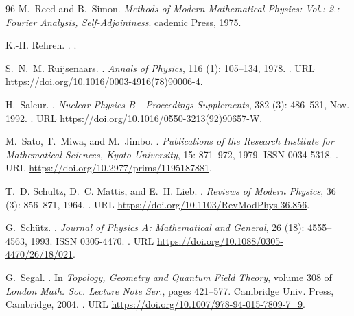 \documentclass[a4paper, 11pt]{article}
\DeclareMathOperator{\1}{\mathds{1}}
\begin{document}
\begin{thebibliography}{96}
M.~{R}eed and B.~{S}imon.
\newblock \emph{{Methods of Modern Mathematical Physics: Vol.: 2.: Fourier
  Analysis, Self-Adjointness}}.
cademic {P}ress, 1975.

K.-H. Rehren.
.
.

S.~N.~M. Ruijsenaars.
.
\newblock \emph{Annals of Physics}, 116 (1): 105--134, 1978.
\newblock {}.
\newblock URL \url{https://doi.org/10.1016/0003-4916(78)90006-4}.

H.~Saleur.
.
\newblock \emph{Nuclear Physics B - Proceedings Supplements}, 382
  (3): 486--531, Nov. 1992.
\newblock {}.
\newblock URL \url{https://doi.org/10.1016/0550-3213(92)90657-W}.

M.~Sato, T.~Miwa, and M.~Jimbo.
.
\newblock \emph{Publications of the Research Institute for Mathematical
  Sciences, Kyoto University}, 15: 871--972, 1979.
\newblock ISSN 0034-5318.
\newblock {}.
\newblock URL \url{https://doi.org/10.2977/prims/1195187881}.

T.~D. Schultz, D.~C. Mattis, and E.~H. Lieb.
.
\newblock \emph{Reviews of Modern Physics}, 36 (3): 856--871,
  1964.
\newblock {}.
\newblock URL \url{https://doi.org/10.1103/RevModPhys.36.856}.

G.~Schütz.
.
\newblock \emph{Journal of Physics A: Mathematical and General}, 26
  (18): 4555--4563, 1993.
\newblock ISSN 0305-4470.
\newblock {}.
\newblock URL \url{https://doi.org/10.1088/0305-4470/26/18/021}.

G.~Segal.
.
\newblock In \emph{Topology, Geometry and Quantum Field Theory}, volume 308 of
  \emph{London {{Math}}. {{Soc}}. {{Lecture Note Ser}}.}, pages 421--577.
  {Cambridge Univ. Press, Cambridge}, 2004.
\newblock {}.
\newblock URL \url{https://doi.org/10.1007/978-94-015-7809-7_9}.


\end{thebibliography}
\end{document}
